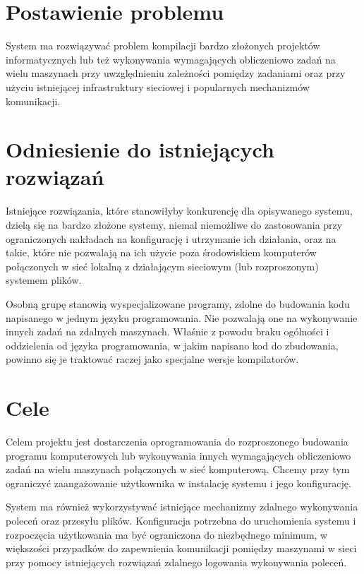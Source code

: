 \documentclass[a4paper]{article}
\begin{document}
\section{Postawienie problemu}

System ma rozwiązywać problem kompilacji bardzo złożonych projektów informatycznych lub też wykonywania wymagających obliczeniowo zadań na wielu maszynach przy uwzględnieniu zależności pomiędzy zadaniami oraz przy użyciu istniejącej infrastruktury sieciowej i popularnych mechanizmów komunikacji.

\section{Odniesienie do istniejących rozwiązań}

Istniejące rozwiązania, które stanowiłyby konkurencję dla opisywanego systemu, dzielą się na bardzo złożone systemy, niemal niemożliwe do zastosowania przy ograniczonych nakładach na konfigurację i utrzymanie ich działania, oraz na takie, które nie pozwalają na ich użycie poza środowiskiem komputerów połączonych w sieć lokalną z działającym sieciowym (lub rozproszonym) systemem plików.

Osobną grupę stanowią wyspecjalizowane programy, zdolne do budowania kodu napisanego w jednym języku programowania. Nie pozwalają one na wykonywanie innych zadań na zdalnych maszynach. Właśnie z powodu braku ogólności i oddzielenia od języka programowania, w jakim napisano kod do zbudowania, powinno się je traktować raczej jako specjalne wersje kompilatorów.

\section{Cele}

Celem projektu jest dostarczenia oprogramowania do rozproszonego budowania programu komputerowych lub wykonywania innych wymagających obliczeniowo zadań na wielu maszynach połączonych w sieć komputerową. Chcemy przy tym ograniczyć zaangażowanie użytkownika w instalację systemu i jego konfigurację.

System ma również wykorzystywać istniejące mechanizmy zdalnego wykonywania poleceń oraz przesyłu plików. Konfiguracja potrzebna do uruchomienia systemu i rozpoczęcia użytkowania ma być ograniczona do niezbędnego minimum, w większości przypadków do zapewnienia komunikacji pomiędzy maszynami w sieci przy pomocy istniejących rozwiązań zdalnego logowania wykonywania poleceń.
\end{document}
